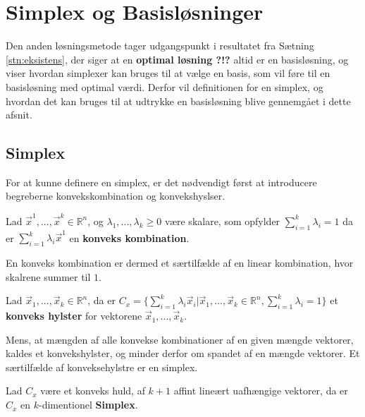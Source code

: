 \section{Simplex og Basisløsninger}
Den anden løsningsmetode tager udgangspunkt i resultatet fra Sætning \ref{stn:eksistens}, der siger at en \textbf{optimal løsning ?!?} altid er en basisløsning, og viser hvordan simplexer kan bruges til at vælge en basis, som vil føre til en basisløsning med optimal værdi.
Derfor vil definitionen for en simplex, og hvordan det kan bruges til at udtrykke en basisløsning blive gennemgået i dette afsnit.
\subsection{Simplex}
For at kunne definere en simplex, er det nødvendigt først at introducere begreberne konvekskombination og konvekshyslser.
\begin{defn}
Lad $\vec{x}^1, ...,\vec{x}^k \in \mathds{R}^n$, og $\lambda_1,..., \lambda_k \geq 0 $ være skalare, som opfylder $\sum_{i=1}^k \lambda_i =1$ da er $\sum_{i=1}^k \lambda_i \vec{x}^1$ en \textbf{konveks kombination}.
\label{def:KonveksKombination}
\end{defn}
En konveks kombination er dermed et særtilfælde af en linear kombination, hvor skalrene summer til $1$.
\begin{defn}
Lad $\vec{x}_1, ...,\vec{x}_k \in \mathds{R}^n$, da er $C_{x} = \{\sum_{i=1}^k \lambda_i \vec{x}_i| \vec{x}_1, ...,\vec{x}_k \in \mathds{R}^n, \sum_{i=1}^k \lambda_i =1\}$ et \textbf{konveks hylster} for vektorene $\vec{x}_1, ...,\vec{x}_k$. 
\label{def:Konvekshuld}
\end{defn}
Mens, at mængden af alle konvekse kombinationer af en given mængde vektorer, kaldes et konvekshylster, og minder derfor om spandet af en mængde vektorer.
Et særtilfælde af konveksehylstre er en simplex.
\begin{defn}[Simplex]
Lad $C_x$ være et konveks huld, af $k+1$ affint lineært uafhængige vektorer, da er $C_x$ en $k$-dimentionel \textbf{Simplex}.
\label{def:simplex}
\end{defn}
